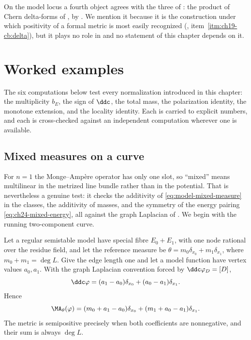 \begin{remark}
\label{rem:ch24-delta-forms}
On the model locus a fourth object agrees with the three of
: the product of Chern delta-forms of
, by
.  We mention it because it is the
construction under which positivity of a formal metric is most easily
recognized (,
item~\cref{itm:ch19-cb:delta}), but it plays no role in
 and no statement of this chapter depends on it.
\end{remark}

\section{Worked examples}
\label{sec:ch24-examples}

The six computations below test every normalization introduced in this
chapter: the multiplicity \(b_E\), the sign of \(\ddc\), the total mass, the
polarization identity, the monotone extension, and the locality identity.
Each is carried to explicit numbers, and each is cross-checked against an
independent computation wherever one is available.

\subsection{Mixed measures on a curve}
\label{sec:ch24-ex-curve}

For \(n=1\) the Monge--Amp\`ere operator has only one slot, so ``mixed''
means multilinear in the metrized line bundle rather than in the potential.
That is nevertheless a genuine test: it checks the additivity of
\eqref{eq:model-mixed-measure} in the classes, the additivity of masses, and
the symmetry of the energy pairing \eqref{eq:ch24-mixed-energy}, all against
the graph Laplacian of .  We begin with the
running two-component curve.

\begin{example}
\label{ex:two-vertex-ma}
Let a regular semistable model have special fibre \(E_0+E_1\), with one
node rational over the residue field, and let the reference measure be
\(\theta=m_0\delta_{x_0}+m_1\delta_{x_1}\), where
\(m_0+m_1=\deg L\). Give the edge length one and let a model function have
vertex values \(a_0,a_1\). With the graph Laplacian convention forced by
\(\ddc\varphi_D=[D]\),
\[
 \ddc\varphi=(a_1-a_0)\delta_{x_0}+(a_0-a_1)\delta_{x_1}.
\]
Hence
\[
 \MA_\theta(\varphi)
 =(m_0+a_1-a_0)\delta_{x_0}
 +(m_1+a_0-a_1)\delta_{x_1}.
\]
The metric is semipositive precisely when both coefficients are nonnegative,
and their sum is always \(\deg L\).
\end{example}


